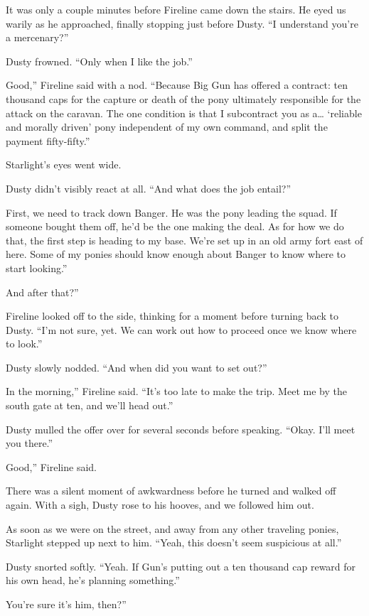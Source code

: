 It was only a couple minutes before Fireline came down the stairs. He eyed us warily as he approached, finally stopping just before Dusty. “I understand you’re a mercenary?”

Dusty frowned. “Only when I like the job.”

\leavevmode{}Good,” Fireline said with a nod. “Because Big Gun has offered a contract: ten thousand caps for the capture or death of the pony ultimately responsible for the attack on the caravan. The one condition is that I subcontract you as a… ‘reliable and morally driven’ pony independent of my own command, and split the payment fifty-fifty.”

Starlight’s eyes went wide.

Dusty didn’t visibly react at all. “And what does the job entail?”

\leavevmode{}First, we need to track down Banger. He was the pony leading the squad. If someone bought them off, he’d be the one making the deal. As for how we do that, the first step is heading to my base. We’re set up in an old army fort east of here. Some of my ponies should know enough about Banger to know where to start looking.”

\leavevmode{}And after that?”

Fireline looked off to the side, thinking for a moment before turning back to Dusty. “I’m not sure, yet. We can work out how to proceed once we know where to look.”

Dusty slowly nodded. “And when did you want to set out?”

\leavevmode{}In the morning,” Fireline said. “It’s too late to make the trip. Meet me by the south gate at ten, and we’ll head out.”

Dusty mulled the offer over for several seconds before speaking. “Okay. I’ll meet you there.”

\leavevmode{}Good,” Fireline said.

There was a silent moment of awkwardness before he turned and walked off again. With a sigh, Dusty rose to his hooves, and we followed him out.

As soon as we were on the street, and away from any other traveling ponies, Starlight stepped up next to him. “Yeah, this doesn’t seem suspicious at all.”

Dusty snorted softly. “Yeah. If Gun’s putting out a ten thousand cap reward for his own head, he’s planning something.”

\leavevmode{}You’re sure it’s him, then?”


